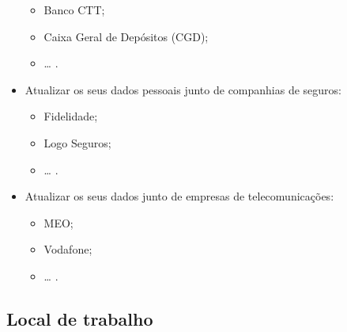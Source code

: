 \begin{itemize}
\begin{itemize}
		\item Banco CTT;
		\item Caixa Geral de Depósitos (CGD);
		\item \ldots{} .
	\end{itemize}
	\newpage
	\item Atualizar os seus dados pessoais junto de companhias de seguros:
	\begin{itemize}
		\item Fidelidade;
		\item Logo Seguros;
		\item \ldots{} .
	\end{itemize}
	\item Atualizar os seus dados junto de empresas de telecomunicações:
	\begin{itemize}
		\item MEO;
		\item Vodafone;
		\item \ldots{} .
	\end{itemize}
\end{itemize}

\subsection{Local de trabalho}

